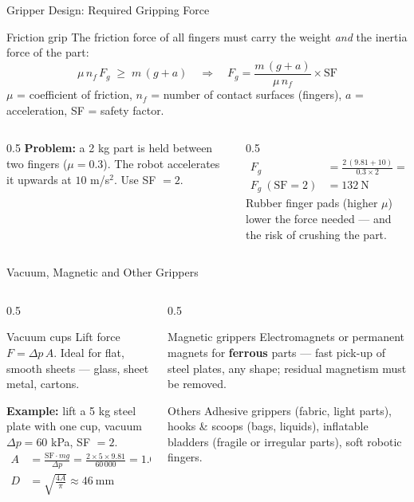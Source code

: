 \documentclass[aspectratio=169]{beamer}
\begin{document}
	\begin{frame}{Gripper Design: Required Gripping Force}
		\begin{block}{Friction grip}
			The friction force of all fingers must carry the weight \emph{and} the inertia force of the part:
			\[
			\mu\, n_f\, F_g \;\ge\; m\,(g + a)
			\quad\Longrightarrow\quad
			F_g = \frac{m\,(g + a)}{\mu\, n_f}\times\text{SF}
			\]
			$\mu$ = coefficient of friction, $n_f$ = number of contact surfaces (fingers), $a$ = acceleration, SF = safety factor.
		\end{block}
		\begin{columns}[T]
			\begin{column}{0.5\textwidth}
				\textbf{Problem:} a 2 kg part is held between two fingers ($\mu = 0.3$). The robot accelerates it upwards at $10$ m/s$^2$. Use SF $= 2$.
			\end{column}
			\begin{column}{0.5\textwidth}
				\small
				\begin{align*}
					F_g &= \frac{2\,(9.81 + 10)}{0.3\times2} = 66.0\ \text{N}\\
					F_g\ (\text{SF} = 2) &= \boxed{132\ \text{N}}
				\end{align*}
				\footnotesize Rubber finger pads (higher $\mu$) lower the force needed --- and the risk of crushing the part.
			\end{column}
		\end{columns}
	\end{frame}

	\begin{frame}{Vacuum, Magnetic and Other Grippers}
		\begin{columns}[T]
			\begin{column}{0.5\textwidth}
				\begin{block}{Vacuum cups}
					\small Lift force $F = \Delta p\,A$. Ideal for flat, smooth sheets --- glass, sheet metal, cartons.
				\end{block}
				\textbf{Example:} lift a 5 kg steel plate with one cup, vacuum $\Delta p = 60$ kPa, SF $= 2$.
				\small
				\begin{align*}
					A &= \frac{\text{SF}\cdot m g}{\Delta p} = \frac{2\times5\times9.81}{60\,000} = 1.64\times10^{-3}\ \text{m}^2\\
					D &= \sqrt{\tfrac{4A}{\pi}} \approx \boxed{46\ \text{mm}}
				\end{align*}
			\end{column}
			\begin{column}{0.5\textwidth}
				\begin{block}{Magnetic grippers}
					\small Electromagnets or permanent magnets for \textbf{ferrous} parts --- fast pick-up of steel plates, any shape; residual magnetism must be removed.
				\end{block}
				\begin{block}{Others}
					\small Adhesive grippers (fabric, light parts), hooks \& scoops (bags, liquids), inflatable bladders (fragile or irregular parts), soft robotic fingers.
				\end{block}
			\end{column}
		\end{columns}
	\end{frame}
\end{document}

